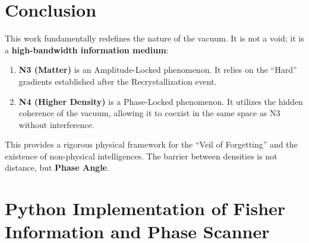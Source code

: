 \documentclass[11pt, twoside]{article}
\begin{document}
\begin{table}[H]
\centering
\caption{Replication Checkpoint Manifest for Vacuum Phase Information Extraction.}
\label{tab:replication_consciousness}
\end{table}

\section{Conclusion}
This work fundamentally redefines the nature of the vacuum. It is not a void; it is a \textbf{high-bandwidth information medium}:
\begin{enumerate}
    \item \textbf{N3 (Matter)} is an Amplitude-Locked phenomenon. It relies on the ``Hard'' gradients established after the Recrystallization event.
    \item \textbf{N4 (Higher Density)} is a Phase-Locked phenomenon. It utilizes the hidden coherence of the vacuum, allowing it to coexist in the same space as N3 without interference.
\end{enumerate}
This provides a rigorous physical framework for the ``Veil of Forgetting'' and the existence of non-physical intelligences. The barrier between densities is not distance, but \textbf{Phase Angle}.

\appendix
\section{Python Implementation of Fisher Information and Phase Scanner}
\end{document}
